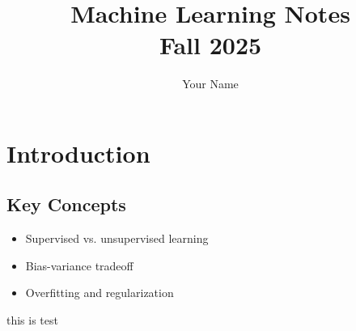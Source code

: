 \documentclass{report}
\title{\Huge{Machine Learning Notes}\\[4pt]\large{Fall 2025}}
\author{Your Name}
\date{}
\begin{document}
\pagecolor{tnBg}
\color{tnFg}

\maketitle
\tableofcontents
\newpage

\chapter{Introduction}




\section{Key Concepts}

\begin{layerTakeaways}
\begin{itemize}
  \item Supervised vs. unsupervised learning
  \item Bias-variance tradeoff
  \item Overfitting and regularization
\end{itemize}
\end{layerTakeaways}
\begin{layerTakeaways}
	this is test
\end{layerTakeaways}

% 
% 
\end{document}
